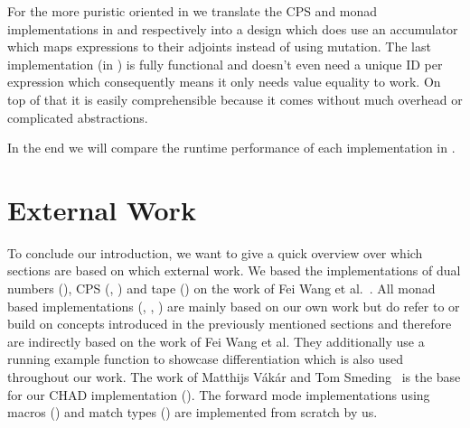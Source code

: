 For the more puristic oriented in  we translate the CPS and monad implementations in  and  respectively into a design which does use an accumulator which maps expressions to their adjoints instead of using mutation. The last implementation (in ) is fully functional and doesn't even need a unique ID per expression which consequently means it only needs value equality to work. On top of that it is easily comprehensible because it comes without much overhead or complicated abstractions.

In the end we will compare the runtime performance of each implementation in .

\section{External Work}
To conclude our introduction, we want to give a quick overview over which sections are based on which external work. We based the implementations of dual numbers (), CPS (, ) and tape () on the work of Fei Wang et al.~\cite{lantern}. All monad based implementations (, , ) are mainly based on our own work but do refer to or build on concepts introduced in the previously mentioned sections and therefore are indirectly based on the work of Fei Wang et al. They additionally use a running example function to showcase differentiation which is also used throughout our work. The work of Matthijs Vákár and Tom Smeding~\cite{chad} is the base for our CHAD implementation (). The forward mode implementations using macros () and match types () are implemented from scratch by us.






















